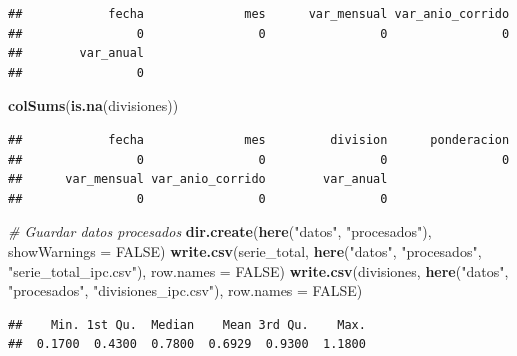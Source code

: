 \documentclass[
]{article}
\newenvironment{Shaded}{\begin{snugshade}}{\end{snugshade}}
\newcommand{\AttributeTok}[1]{\textcolor[rgb]{0.13,0.29,0.53}{#1}}
\newcommand{\CommentTok}[1]{\textcolor[rgb]{0.56,0.35,0.01}{\textit{#1}}}
\newcommand{\ConstantTok}[1]{\textcolor[rgb]{0.56,0.35,0.01}{#1}}
\newcommand{\FunctionTok}[1]{\textcolor[rgb]{0.13,0.29,0.53}{\textbf{#1}}}
\newcommand{\NormalTok}[1]{#1}
\newcommand{\SpecialCharTok}[1]{\textcolor[rgb]{0.81,0.36,0.00}{\textbf{#1}}}
\newcommand{\StringTok}[1]{\textcolor[rgb]{0.31,0.60,0.02}{#1}}
\begin{document}
\begin{verbatim}
##            fecha              mes      var_mensual var_anio_corrido 
##                0                0                0                0 
##        var_anual 
##                0
\end{verbatim}

\begin{Shaded}
\begin{Highlighting}[]
\FunctionTok{colSums}\NormalTok{(}\FunctionTok{is.na}\NormalTok{(divisiones))}
\end{Highlighting}
\end{Shaded}

\begin{verbatim}
##            fecha              mes         division      ponderacion 
##                0                0                0                0 
##      var_mensual var_anio_corrido        var_anual 
##                0                0                0
\end{verbatim}

\begin{Shaded}
\begin{Highlighting}[]
\CommentTok{\# Guardar datos procesados}
\FunctionTok{dir.create}\NormalTok{(}\FunctionTok{here}\NormalTok{(}\StringTok{"datos"}\NormalTok{, }\StringTok{"procesados"}\NormalTok{), }\AttributeTok{showWarnings =} \ConstantTok{FALSE}\NormalTok{)}
\FunctionTok{write.csv}\NormalTok{(serie\_total, }\FunctionTok{here}\NormalTok{(}\StringTok{"datos"}\NormalTok{, }\StringTok{"procesados"}\NormalTok{, }\StringTok{"serie\_total\_ipc.csv"}\NormalTok{), }\AttributeTok{row.names =} \ConstantTok{FALSE}\NormalTok{)}
\FunctionTok{write.csv}\NormalTok{(divisiones, }\FunctionTok{here}\NormalTok{(}\StringTok{"datos"}\NormalTok{, }\StringTok{"procesados"}\NormalTok{, }\StringTok{"divisiones\_ipc.csv"}\NormalTok{), }\AttributeTok{row.names =} \ConstantTok{FALSE}\NormalTok{)}
\end{Highlighting}
\end{Shaded}

\begin{Shaded}
\end{Shaded}

\begin{verbatim}
##    Min. 1st Qu.  Median    Mean 3rd Qu.    Max. 
##  0.1700  0.4300  0.7800  0.6929  0.9300  1.1800
\end{verbatim}
\end{document}

